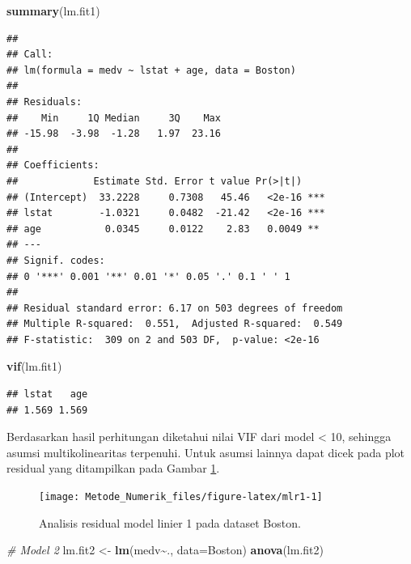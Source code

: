 \documentclass[
]{book}
\newenvironment{Shaded}{\begin{snugshade}}{\end{snugshade}}
\newcommand{\AttributeTok}[1]{\textcolor[rgb]{0.13,0.29,0.53}{#1}}
\newcommand{\CommentTok}[1]{\textcolor[rgb]{0.56,0.35,0.01}{\textit{#1}}}
\newcommand{\FunctionTok}[1]{\textcolor[rgb]{0.13,0.29,0.53}{\textbf{#1}}}
\newcommand{\NormalTok}[1]{#1}
\newcommand{\OtherTok}[1]{\textcolor[rgb]{0.56,0.35,0.01}{#1}}
\newcommand{\SpecialCharTok}[1]{\textcolor[rgb]{0.81,0.36,0.00}{\textbf{#1}}}
\theoremstyle{definition}
\theoremstyle{definition}
\theoremstyle{definition}
\theoremstyle{definition}
\theoremstyle{remark}
\begin{document}
\begin{Shaded}
\begin{Highlighting}[]
\FunctionTok{summary}\NormalTok{(lm.fit1)}
\end{Highlighting}
\end{Shaded}

\begin{verbatim}
## 
## Call:
## lm(formula = medv ~ lstat + age, data = Boston)
## 
## Residuals:
##    Min     1Q Median     3Q    Max 
## -15.98  -3.98  -1.28   1.97  23.16 
## 
## Coefficients:
##             Estimate Std. Error t value Pr(>|t|)    
## (Intercept)  33.2228     0.7308   45.46   <2e-16 ***
## lstat        -1.0321     0.0482  -21.42   <2e-16 ***
## age           0.0345     0.0122    2.83   0.0049 ** 
## ---
## Signif. codes:  
## 0 '***' 0.001 '**' 0.01 '*' 0.05 '.' 0.1 ' ' 1
## 
## Residual standard error: 6.17 on 503 degrees of freedom
## Multiple R-squared:  0.551,  Adjusted R-squared:  0.549 
## F-statistic:  309 on 2 and 503 DF,  p-value: <2e-16
\end{verbatim}

\begin{Shaded}
\begin{Highlighting}[]
\FunctionTok{vif}\NormalTok{(lm.fit1)}
\end{Highlighting}
\end{Shaded}

\begin{verbatim}
## lstat   age 
## 1.569 1.569
\end{verbatim}

Berdasarkan hasil perhitungan diketahui nilai VIF dari model \textless{} 10, sehingga asumsi multikolinearitas terpenuhi. Untuk asumsi lainnya dapat dicek pada plot residual yang ditampilkan pada Gambar \ref{fig:mlr1}.

\begin{figure}

{\centering \texttt{[image: Metode\_Numerik\_files/figure-latex/mlr1-1]} 

}

\caption{Analisis residual model linier 1 pada dataset Boston.}\label{fig:mlr1}
\end{figure}

\begin{Shaded}
\begin{Highlighting}[]
\CommentTok{\# Model 2}
\NormalTok{lm.fit2 }\OtherTok{\textless{}{-}} \FunctionTok{lm}\NormalTok{(medv}\SpecialCharTok{\textasciitilde{}}\NormalTok{., }\AttributeTok{data=}\NormalTok{Boston)}
\FunctionTok{anova}\NormalTok{(lm.fit2)}
\end{Highlighting}
\end{Shaded}
\end{document}
